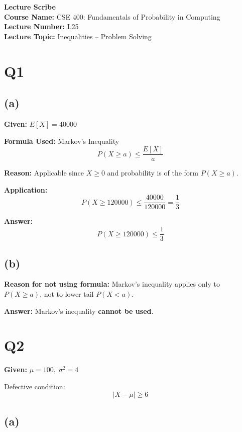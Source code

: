 \documentclass[12pt]{article}
\begin{document}
\begin{center}
\textbf{\Large Lecture Scribe} \\[0.3cm]
\textbf{Course Name:} CSE 400: Fundamentals of Probability in Computing \\[0.2cm]
\textbf{Lecture Number:} L25 \\[0.2cm]
\textbf{Lecture Topic:} Inequalities -- Problem Solving
\end{center}

\vspace{0.5cm}

\section*{Q1}

\subsection*{(a)}

\textbf{Given:} $E[X] = 40000$

\textbf{Formula Used:} Markov’s Inequality
\[
P(X \ge a) \le \frac{E[X]}{a}
\]

\textbf{Reason:} Applicable since $X \ge 0$ and probability is of the form $P(X \ge a)$.

\textbf{Application:}
\[
P(X \ge 120000) \le \frac{40000}{120000} = \frac{1}{3}
\]

\textbf{Answer:}
\[
P(X \ge 120000) \le \frac{1}{3}
\]

\subsection*{(b)}

\textbf{Reason for not using formula:} Markov’s inequality applies only to $P(X \ge a)$, not to lower tail $P(X < a)$.

\textbf{Answer:} Markov’s inequality \textbf{cannot be used}.

\section*{Q2}

\textbf{Given:} $\mu = 100,\; \sigma^2 = 4$

Defective condition:
\[
|X - \mu| \ge 6
\]

\subsection*{(a)}
\end{document}
